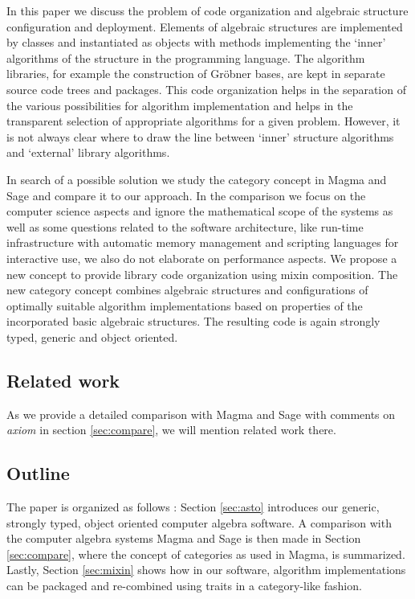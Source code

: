 \documentclass{llncs}
\begin{document}
In this paper we discuss the problem of code organization and
algebraic structure configuration and deployment. Elements of algebraic
structures are implemented by classes and instantiated as objects with
methods implementing the `inner' algorithms of the structure in the
programming language. The algorithm libraries, for example the
construction of Gr\"obner bases, are kept in separate source code trees
and packages. This code organization helps in the separation of the
various possibilities for algorithm implementation and helps in the
transparent selection of appropriate algorithms for a given problem.
However, it is not always clear where to draw the line between `inner'
structure algorithms and `external' library algorithms.

In search of a possible solution we study the category concept in
Magma \cite{BosmaCannonPlayoust:1997} and Sage \cite{Stein:2005} and
compare it to our approach. In the comparison we focus on the computer
science aspects and ignore the mathematical scope of the systems as
well as some questions related to the software architecture, like
run-time infrastructure with automatic memory management and scripting
languages for interactive use, we also do not elaborate on performance
aspects.
%
We propose a new concept to provide library code organization
using mixin composition. The new category concept combines algebraic
structures and configurations of optimally suitable algorithm
implementations based on properties of the incorporated basic
algebraic structures.  The resulting code is again strongly typed,
generic and object oriented.


\subsection{Related work} %

As we provide a detailed comparison with Magma
\cite{BosmaCannonPlayoust:1997} and Sage \cite{Stein:2005} with
comments on {\em axiom} \cite{JenksSutor:1992,Watt:2003} in section
\ref{sec:compare}, we will mention related work there.


\subsection{Outline} %

The paper is organized as follows : Section \ref{sec:asto} introduces
our generic, strongly typed, object oriented computer algebra
software. A comparison with the computer algebra systems Magma and
Sage is then made in Section \ref{sec:compare}, where the concept of
categories as used in Magma, is summarized. Lastly, Section
\ref{sec:mixin} shows how in our software, algorithm implementations
can be packaged and re-combined using traits in a category-like
fashion.
\end{document}
